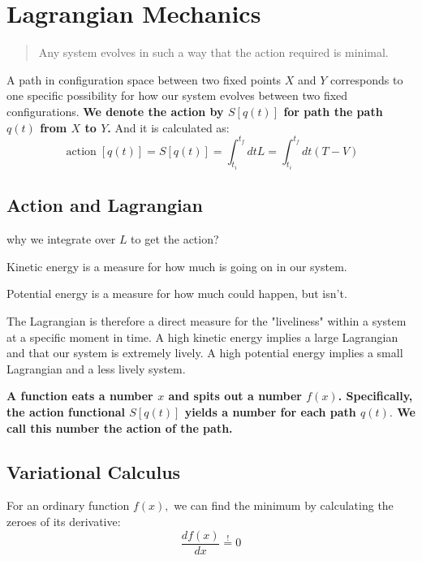 \section{Lagrangian Mechanics}
\begin{quote}
    Any system evolves in such a way that the action required is minimal.
\end{quote}
A path in configuration space between two fixed points $X$ and $Y$ corresponds to one specific possibility for how our system evolves between two fixed configurations. \textbf{We denote the action by $S[q(t)]$ for path the path $q(t)$ from $X$ to $Y$.} And it is calculated as:
$$
\operatorname{action}[q(t)]=S[q(t)]=\int_{t_{i}}^{t_{f}} d t L=\int_{t_{i}}^{t_{f}} d t(T-V)
$$
\subsection{Action and Lagrangian}
\begin{mybox}
why we integrate over $L$ to get the action?
\end{mybox}

\begin{mybox2}
Kinetic energy is a measure for how much is going on in our system.

Potential energy is a measure for how much could happen, but isn’t.

The Lagrangian is therefore a direct measure for the "liveliness" within a system at a specific moment in time. A high kinetic energy implies a large Lagrangian and that our system is extremely lively. A high potential energy implies a small Lagrangian and a less lively system.
\end{mybox2}


\textbf{A function eats a number $x$ and spits out a number $f(x)$. Specifically, the action functional $S[q(t)]$ yields a number for each path $q(t) .$ We call this number the action of the path.}


\subsection{Variational Calculus}
For an ordinary function $f(x),$ we can find the minimum by
calculating the zeroes of its derivative:
$$
\frac{d f(x)}{d x} \stackrel{!}{=} 0
$$

